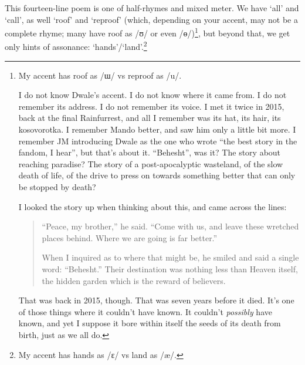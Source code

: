 \documentclass[12pt,oneside]{memoir}
\begin{document}
This fourteen-line poem is one of half-rhymes and mixed meter. We have `all' and `call', as well `roof' and `reproof' (which, depending on your accent, may not be a complete rhyme; many have roof as /{\IPAfont ʊ}/ or even /{\IPAfont ɵ}/)\footnote{My accent has roof as /{\IPAfont ɯ}/ vs reproof as /{\IPAfont u}/.\par I do not know Dwale's accent. I do not know where it came from. I do not remember its address. I do not remember its voice. I met it twice in 2015, back at the final Rainfurrest, and all I remember was its hat, its hair, its kosovorotka. I remember Mando better, and saw him only a little bit more. I remember JM introducing Dwale as the one who wrote ``the best story in the fandom, I hear'', but that's about it. ``Behesht'', was it? The story about reaching paradise? The story of a post-apocalyptic wasteland, of the slow death of life, of the drive to press on towards something better that can only be stopped by death?\par 
I looked the story up when thinking about this, and came across the lines:\begin{quote}``Peace, my brother,'' he said. ``Come with us, and leave these wretched places behind. Where we are going is far better.''\par
When I inquired as to where that might be, he smiled and said a single word: ``Behesht.'' Their destination was nothing less than Heaven itself, the hidden garden which is the reward of believers.\par\parencite{behesht}\end{quote}\par 
That was back in 2015, though. That was seven years before it died. It's one of those things where it couldn't have known. It couldn't \emph{possibly} have known, and yet I suppose it bore within itself the seeds of its death from birth, just as we all do.\footnotemark}, but beyond that, we get only hints of assonance: `hands'/`land'.\footnote{My accent has hands as /ɛ/ vs land as /æ/.}
\end{document}
